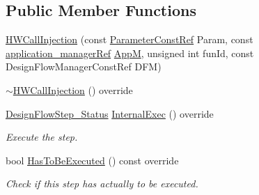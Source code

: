 \subsection*{Public Member Functions}
\begin{DoxyCompactItemize}
\item 
\hyperlink{classHWCallInjection_aef59f1a3976f0b57603584279d628446}{H\+W\+Call\+Injection} (const \hyperlink{Parameter_8hpp_a37841774a6fcb479b597fdf8955eb4ea}{Parameter\+Const\+Ref} Param, const \hyperlink{application__manager_8hpp_a04ccad4e5ee401e8934306672082c180}{application\+\_\+manager\+Ref} \hyperlink{classFrontendFlowStep_a0ac0d8db2a378416583f51c4faa59d15}{AppM}, unsigned int fun\+Id, const Design\+Flow\+Manager\+Const\+Ref D\+FM)
\item 
\hyperlink{classHWCallInjection_a751bfc91e0841555708f977dfe7398aa}{$\sim$\+H\+W\+Call\+Injection} () override
\item 
\hyperlink{design__flow__step_8hpp_afb1f0d73069c26076b8d31dbc8ebecdf}{Design\+Flow\+Step\+\_\+\+Status} \hyperlink{classHWCallInjection_a7c601b025163eef724680f402f8ff6c0}{Internal\+Exec} () override
\begin{DoxyCompactList}\small\item\em Execute the step. \end{DoxyCompactList}\item 
bool \hyperlink{classHWCallInjection_a9d5dd1b5b7abe33cced04220a229303c}{Has\+To\+Be\+Executed} () const override
\begin{DoxyCompactList}\small\item\em Check if this step has actually to be executed. \end{DoxyCompactList}\end{DoxyCompactItemize}
